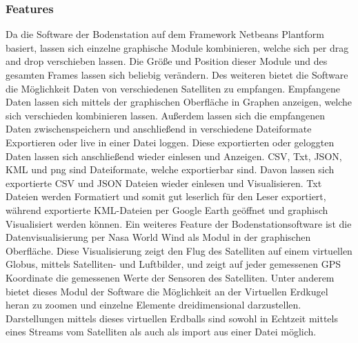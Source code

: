 \subsubsection{Features}
Da die Software der Bodenstation auf dem Framework Netbeans Plantform basiert, lassen sich einzelne graphische Module kombinieren, welche sich per drag and drop verschieben lassen. Die Größe und Position dieser Module und des gesamten Frames lassen sich beliebig verändern. Des weiteren bietet die Software die Möglichkeit Daten von verschiedenen Satelliten zu empfangen. Empfangene Daten lassen sich mittels der graphischen Oberfläche in Graphen anzeigen, welche sich verschieden kombinieren lassen. Außerdem lassen sich die empfangenen Daten zwischenspeichern und anschließend in verschiedene Dateiformate Exportieren oder live in einer Datei loggen. Diese exportierten oder geloggten Daten lassen sich anschließend wieder einlesen und Anzeigen. CSV, Txt, JSON, KML und png sind Dateiformate, welche exportierbar sind. Davon lassen sich exportierte CSV und JSON Dateien wieder einlesen und Visualisieren. Txt Dateien werden Formatiert und somit gut leserlich für den Leser exportiert, während exportierte KML-Dateien per Google Earth geöffnet und graphisch Visualisiert werden können. Ein weiteres Feature der Bodenstationsoftware ist die Datenvisualisierung per Nasa World Wind als Modul in der graphischen Oberfläche. Diese Visualisierung zeigt den Flug des Satelliten auf einem virtuellen Globus, mittels Satelliten- und Luftbilder, und zeigt auf jeder gemessenen GPS Koordinate die gemessenen Werte der Sensoren des Satelliten. Unter anderem bietet dieses Modul der Software die Möglichkeit an der Virtuellen Erdkugel heran zu zoomen und einzelne Elemente dreidimensional darzustellen. Darstellungen mittels dieses virtuellen Erdballs sind sowohl in Echtzeit mittels eines Streams vom Satelliten als auch als import aus einer Datei möglich.
